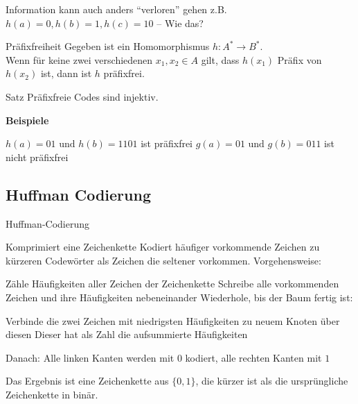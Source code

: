 \documentclass[handout]{beamer}
\begin{document}
\begin{frame}
\begin{itemize}
\pitem Information kann auch anders ``verloren'' gehen
\pitem[$\rightarrow$] z.B. $h(a) = 0, h(b) = 1, h(c) = 10$ \p -- Wie das?
\end{itemize} \pause
\begin{block}{Präfixfreiheit}
\p Gegeben ist ein Homomorphismus $h: A^* \rightarrow B^*$.\\
\p Wenn für keine zwei verschiedenen $x_1, x_2 \in A$ gilt\p , dass $h(x_1)$  Präfix von $h(x_2)$ ist\p , dann ist $h$ präfixfrei. 
\end{block}
\pause
\begin{block}{Satz}
Präfixfreie Codes sind injektiv.
\end{block} \pause
\textbf{Beispiele}\\
\begin{itemize}
\pitem $h(a) = 01 \text{ und } h(b) = 1101 $ ist präfixfrei
\pitem $g(a) = 01 \text{ und } g(b) = 011$ ist nicht präfixfrei
\end{itemize}
\end{frame}

\subsection{Huffman Codierung}

\begin{frame}{Huffman-Codierung}
\begin{itemize}
\pitem Komprimiert eine Zeichenkette
\pitem Kodiert häufiger vorkommende Zeichen zu kürzeren Codewörter als Zeichen die seltener vorkommen.
\pitem Vorgehensweise:
\begin{enumerate}
\pitem Zähle Häufigkeiten aller Zeichen der Zeichenkette
\pitem Schreibe alle vorkommenden Zeichen und ihre Häufigkeiten nebeneinander
\pitem Wiederhole, bis der Baum fertig ist:
\begin{itemize}
\pitem Verbinde die zwei Zeichen mit niedrigsten Häufigkeiten zu neuem Knoten über diesen
\pitem Dieser hat als Zahl die aufsummierte Häufigkeiten
\end{itemize}
\pitem Danach: Alle linken Kanten werden mit $0$ kodiert, alle rechten Kanten mit $1$
\end{enumerate}
\end{itemize}

\p Das Ergebnis ist eine Zeichenkette aus $\{0,1\}$\p , die kürzer ist als die ursprüngliche Zeichenkette in binär.
\end{frame}
\end{document}

